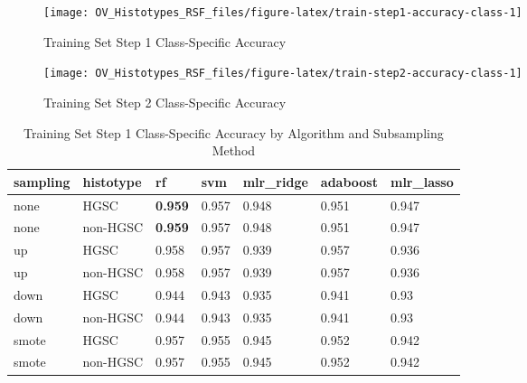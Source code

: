 \documentclass[
]{report}
\begin{document}
\begin{figure}[H]

{\centering \texttt{[image: OV\_Histotypes\_RSF\_files/figure-latex/train-step1-accuracy-class-1]} 

}

\caption{Training Set Step 1 Class-Specific Accuracy}\label{fig:train-step1-accuracy-class}
\end{figure}

\begin{figure}[H]

{\centering \texttt{[image: OV\_Histotypes\_RSF\_files/figure-latex/train-step2-accuracy-class-1]} 

}

\caption{Training Set Step 2 Class-Specific Accuracy}\label{fig:train-step2-accuracy-class}
\end{figure}

\begin{table}

\caption{\label{tab:train-step1-accuracy-class-table}Training Set Step 1 Class-Specific Accuracy by Algorithm and Subsampling Method}
\centering
\begin{tabular}[t]{l|l|l|l|l|l|l}
\hline
sampling & histotype & rf & svm & mlr\_ridge & adaboost & mlr\_lasso\\
\hline
none & HGSC & \textbf{0.959} & 0.957 & 0.948 & 0.951 & 0.947\\
\hline
none & non-HGSC & \textbf{0.959} & 0.957 & 0.948 & 0.951 & 0.947\\
\hline
up & HGSC & 0.958 & 0.957 & 0.939 & 0.957 & 0.936\\
\hline
up & non-HGSC & 0.958 & 0.957 & 0.939 & 0.957 & 0.936\\
\hline
down & HGSC & 0.944 & 0.943 & 0.935 & 0.941 & 0.93\\
\hline
down & non-HGSC & 0.944 & 0.943 & 0.935 & 0.941 & 0.93\\
\hline
smote & HGSC & 0.957 & 0.955 & 0.945 & 0.952 & 0.942\\
\hline
smote & non-HGSC & 0.957 & 0.955 & 0.945 & 0.952 & 0.942\\
\hline
\end{tabular}
\end{table}
\end{document}
